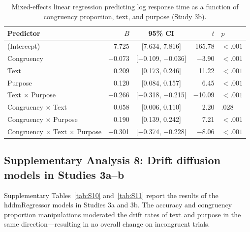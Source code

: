 \documentclass[pdflatex,sn-nature]{sn-jnl}
\begin{document}
\begin{appendices}
\begin{table}[htbp]
\caption{Mixed-effects linear regression predicting log response time as a function of congruency proportion, text, and purpose (Study 3b).}
\label{tab:S9}
\begin{tabular*}{\textwidth}{@{\extracolsep{\fill}}lrcrl@{}}
\toprule
Predictor & $B$ & 95\% CI & $t$ & $p$ \\
\midrule
(Intercept)                                    & 7.725 & [7.634, 7.816] & 165.78  & $<.001$ \\
Congruency                                     & $-$0.073 & [$-$0.109, $-$0.036] & $-$3.90 & $<.001$ \\
Text                                           & 0.209 & [0.173, 0.246] & 11.22   & $<.001$ \\
Purpose                                        & 0.120 & [0.084, 0.157] & 6.45    & $<.001$ \\
Text $\times$ Purpose                          & $-$0.266 & [$-$0.318, $-$0.215] & $-$10.09 & $<.001$ \\
Congruency $\times$ Text                       & 0.058 & [0.006, 0.110] & 2.20    & .028    \\
Congruency $\times$ Purpose                    & 0.190 & [0.139, 0.242] & 7.21    & $<.001$ \\
Congruency $\times$ Text $\times$ Purpose      & $-$0.301 & [$-$0.374, $-$0.228] & $-$8.06 & $<.001$ \\
\bottomrule
\end{tabular*}
\end{table}

\clearpage

\FloatBarrier

\subsection*{Supplementary Analysis 8: Drift diffusion models in Studies 3a--b}
\label{supp:analysis8}

Supplementary Tables~\ref{tab:S10} and~\ref{tab:S11} report the results of the hddmRegressor models in Studies 3a and 3b. The accuracy and congruency proportion manipulations moderated the drift rates of text and purpose in the same direction---resulting in no overall change on incongruent trials.


\end{appendices}
\end{document}
